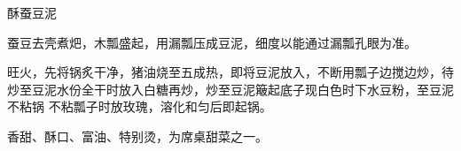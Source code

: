 %
%
%
%
%
%
%
\begin{recipe}{酥蚕豆泥}

\ingredients


\preparation

\step 蚕豆去壳煮𤆵，木瓢盛起，用漏瓢压成豆泥，细度以能通过漏瓢孔眼为准。

\step 旺火，先将锅炙干净，猪油烧至五成热，即将豆泥放入，不断用瓢子边搅边炒，待
炒至豆泥水份全干时放入白糖再炒，炒至豆泥簸起底子现白色时下水豆粉，至豆泥不粘锅
不粘瓢子时放玫瑰，溶化和匀后即起锅。

\features

香甜、酥口、富油、特别烫，为席桌甜菜之一。

\end{recipe}

